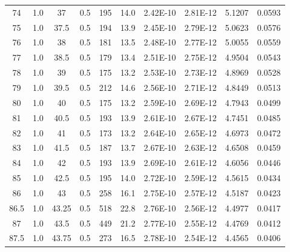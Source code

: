 \begin{maintable}[ht]
\begin{tabular}{cccccccccc}
74          & 1.0   & 37         & 0.5           & 195     & 14.0       & 2.42E-10    & 2.81E-12       & 5.1207    & 0.0593       \\
75          & 1.0   & 37.5       & 0.5           & 194     & 13.9       & 2.45E-10    & 2.79E-12       & 5.0623    & 0.0576       \\
76          & 1.0   & 38         & 0.5           & 181     & 13.5       & 2.48E-10    & 2.77E-12       & 5.0055    & 0.0559       \\
77          & 1.0   & 38.5       & 0.5           & 179     & 13.4       & 2.51E-10    & 2.75E-12       & 4.9504    & 0.0543       \\
78          & 1.0   & 39         & 0.5           & 175     & 13.2       & 2.53E-10    & 2.73E-12       & 4.8969    & 0.0528       \\
79          & 1.0   & 39.5       & 0.5           & 212     & 14.6       & 2.56E-10    & 2.71E-12       & 4.8449    & 0.0513       \\
80          & 1.0   & 40         & 0.5           & 175     & 13.2       & 2.59E-10    & 2.69E-12       & 4.7943    & 0.0499       \\
81          & 1.0   & 40.5       & 0.5           & 193     & 13.9       & 2.61E-10    & 2.67E-12       & 4.7451    & 0.0485       \\
82          & 1.0   & 41         & 0.5           & 173     & 13.2       & 2.64E-10    & 2.65E-12       & 4.6973    & 0.0472       \\
83          & 1.0   & 41.5       & 0.5           & 187     & 13.7       & 2.67E-10    & 2.63E-12       & 4.6508    & 0.0459       \\
84          & 1.0   & 42         & 0.5           & 193     & 13.9       & 2.69E-10    & 2.61E-12       & 4.6056    & 0.0446       \\
85          & 1.0   & 42.5       & 0.5           & 195     & 14.0       & 2.72E-10    & 2.59E-12       & 4.5615    & 0.0434       \\
86          & 1.0   & 43         & 0.5           & 258     & 16.1       & 2.75E-10    & 2.57E-12       & 4.5187    & 0.0423       \\
86.5        & 1.0   & 43.25      & 0.5           & 518     & 22.8       & 2.76E-10    & 2.56E-12       & 4.4977    & 0.0417       \\
87          & 1.0   & 43.5       & 0.5           & 449     & 21.2       & 2.77E-10    & 2.55E-12       & 4.4769    & 0.0412       \\
87.5        & 1.0   & 43.75      & 0.5           & 273     & 16.5       & 2.78E-10    & 2.54E-12       & 4.4565    & 0.0406       \\

\end{tabular}
\end{maintable}
